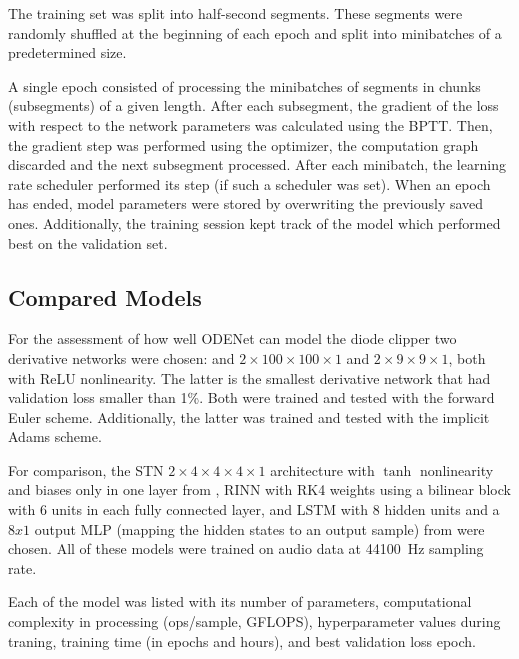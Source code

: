 The training set was split into half-second segments. These segments were randomly shuffled at the beginning of each epoch and split into minibatches of a predetermined size.

A single epoch consisted of processing the minibatches of segments in chunks (subsegments) of a given length. After each subsegment, the gradient of the loss with respect to the network parameters was calculated using the \ac{BPTT}. Then, the gradient step was performed using the optimizer, the computation graph discarded and the next subsegment processed. After each minibatch, the learning rate scheduler performed its step (if such a scheduler was set). When an epoch has ended, model parameters were stored by overwriting the previously saved ones. Additionally, the training session kept track of the model which performed best on the validation set.

\subsection{Compared Models}
\label{sec:diode_clipper_models}

For the assessment of how well ODENet can model the diode clipper two derivative networks were chosen: and $2 \times 100 \times 100 \times 1$ and $2 \times 9 \times 9 \times 1$, both with \ac{ReLU} nonlinearity. The latter is the smallest derivative network that had validation loss smaller than 1\%. Both were trained and tested with the forward Euler scheme. Additionally, the latter was trained and tested with the implicit Adams scheme.

For comparison, the \ac{STN} $2 \times 4 \times 4 \times 4 \times 1$ architecture with $\tanh$ nonlinearity and biases only in one layer from \cite{Parker2019}, \ac{RINN} with \ac{RK}4 weights using a bilinear block with 6 units in each fully connected layer, and \ac{LSTM} with 8 hidden units and a $8 x 1$ output \ac{MLP} (mapping the hidden states to an output sample) from \cite{Wright2019} were chosen. All of these models were trained on audio data at \SI{44100}{Hz} sampling rate.

Each of the model was listed with its number of parameters, computational complexity in processing (ops/sample, GFLOPS), hyperparameter values during traning, training time (in epochs and hours), and best validation loss epoch.  %

